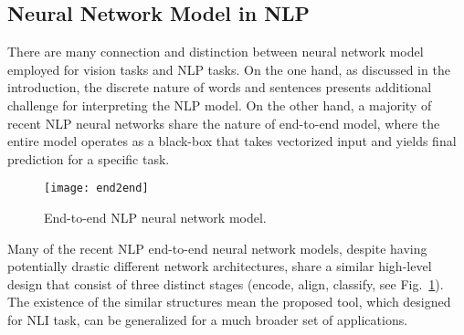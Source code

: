 

\subsection{Neural Network Model in NLP}
There are many connection and distinction between neural network model employed for vision tasks and NLP tasks.
On the one hand, as discussed in the introduction, the discrete nature of words and sentences presents additional challenge for
interpreting the NLP model.
%
On the other hand, a majority of recent NLP neural networks share the nature of
end-to-end model, where the entire model operates as a black-box that takes
vectorized input and yields final prediction for a specific task.

\begin{figure}[htbp]
\centering
 \texttt{[image: end2end]}
 \vspace{-2mm}
 \caption{End-to-end NLP neural network model.}
  \vspace{-2mm}
\label{fig:modelPipeline}
\end{figure}

Many of the recent NLP end-to-end neural network models, despite having potentially drastic different network architectures, share a similar high-level design that consist of three distinct stages (encode, align, classify, see Fig.~\ref{fig:modelPipeline}). 
%
The existence of the similar structures mean the proposed tool, which designed for NLI task, can be generalized for a much broader set of applications.

